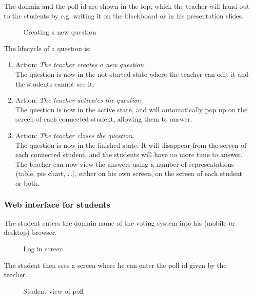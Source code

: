 \documentclass{acm_proc_article-sp}
\begin{document}
The domain and the poll id are shown in the top, which the teacher will hand out to the students by e.g. writing it on the blackboard or in his presentation slides.

\begin{figure}[h]
\centering
{}
\caption{Creating a new question}
\label{fig:create_question}
\end{figure}
The lifecycle of a question is:
\begin{enumerate}
  \item Action: \textit{The teacher creates a new question.}\\
  The question is now in the not started state where the teacher can edit it and the students cannot see it.
  
  \item Action: \textit{The teacher activates the question.} \\ 
  The question is now in the active state, and will automatically pop up on the screen of each connected student, allowing them to answer.
  \item Action:  \textit{The teacher closes the question.} \\
The question is now in the finished state. It will disappear from the screen of each connected student, and the students will have no more time to answer. The teacher can now view the answers using a number of representations (table, pie chart, …), either on his own screen, on the screen of each student or both.
\end{enumerate}

\subsubsection{Web interface for students}
The student enters the domain name of the voting system into his (mobile or desktop) browser.

\begin{figure}[h]
\centering
{}
\caption{Log in screen}
\label{fig:teacher_interface}
\end{figure}


The student then sees a screen where he can enter the poll id given by the teacher.

\begin{figure}[h]
\centering
{}
\caption{Student view of poll}
\label{fig:poll}
\end{figure}
\end{document}
